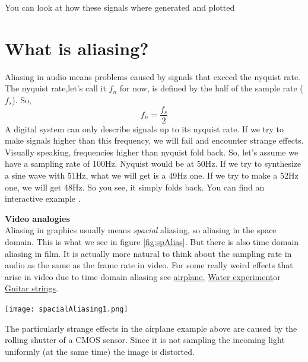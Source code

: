You can look at how these signals where generated and plotted 

\section{What is aliasing?}
Aliasing in audio means problems caused by signals that exceed the nyquist rate.\\
The nyquist rate,let's call it $f_n$ for now, is defined by the half of the sample rate ($f_s$). So,
\begin{equation}
	f_n=\frac{f_s}{2}
\end{equation}
A digital system can only describe signals up to its nyquist rate. If we try to make signals higher than this frequency, we will fail and encounter strange effects.\\
Visually speaking, frequencies higher than nyquist fold back. So, let's assume we have a sampling rate of 100Hz. Nyquist would be at 50Hz. If we try to synthesize a sine wave with 51Hz, what we will get is a 49Hz one. If we try to make a 52Hz one, we will get 48Hz. So you see, it simply folds back. You can find an interactive example .

\begin{framed}
	\textbf{Video analogies}\\
	Aliasing in graphics usually means \textit{spacial} aliasing, so aliasing in the space domain. This is what we see in figure \ref{fig:spAlias}. But there is also time domain aliasing in film. It is actually more natural to think about the sampling rate in audio as the same as the frame rate in video. For some really weird effects that arise in video due to time domain aliasing see \href{https://www.youtube.com/watch?v=LVwmtwZLG88}{airplane}\footnotemark , \href{https://www.youtube.com/watch?v=GBtHeR-hY9Y}{Water experiment}\footnotemark or \href{https://www.youtube.com/watch?v=jcOKTTnOIV8}{Guitar strings}\footnotemark .
	\begin{center}
		\texttt{[image: spacialAliasing1.png]}
		\label{fig:spAlias}
	\end{center}
	The particularly strange effects in the airplane example above are caused by the rolling shutter of a CMOS sensor. Since it is not sampling the incoming light uniformly (at the same time) the image is distorted.
\end{framed}


